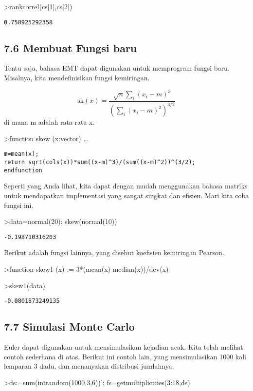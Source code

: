 \documentclass[
]{book}
\begin{document}
\textgreater rankcorrel(cs{[}1{]},cs{[}2{]})

\begin{verbatim}
0.758925292358
\end{verbatim}

\subsection{7.6 Membuat Fungsi baru}\label{membuat-fungsi-baru}

Tentu saja, bahasa EMT dapat digunakan untuk memprogram fungsi baru. Misalnya, kita mendefinisikan fungsi kemiringan.

\[\text{sk}(x) = \dfrac{\sqrt{n} \sum_i (x_i-m)^3}{\left(\sum_i (x_i-m)^2\right)^{3/2}}\]di mana m adalah rata-rata x.

\textgreater function skew (x:vector) \ldots{}

\begin{verbatim}
m=mean(x);
return sqrt(cols(x))*sum((x-m)^3)/(sum((x-m)^2))^(3/2);
endfunction
\end{verbatim}

Seperti yang Anda lihat, kita dapat dengan mudah menggunakan bahasa matriks untuk mendapatkan implementasi yang sangat singkat dan efisien. Mari kita coba fungsi ini.

\textgreater data=normal(20); skew(normal(10))

\begin{verbatim}
-0.198710316203
\end{verbatim}

Berikut adalah fungsi lainnya, yang disebut koefisien kemiringan Pearson.

\textgreater function skew1 (x) := 3*(mean(x)-median(x))/dev(x)

\textgreater skew1(data)

\begin{verbatim}
-0.0801873249135
\end{verbatim}

\subsection{7.7 Simulasi Monte Carlo}\label{simulasi-monte-carlo}

Euler dapat digunakan untuk mensimulasikan kejadian acak. Kita telah melihat contoh sederhana di atas. Berikut ini contoh lain, yang mensimulasikan 1000 kali lemparan 3 dadu, dan menanyakan distribusi jumlahnya.

\textgreater ds:=sum(intrandom(1000,3,6))'; fs=getmultiplicities(3:18,ds)
\end{document}
